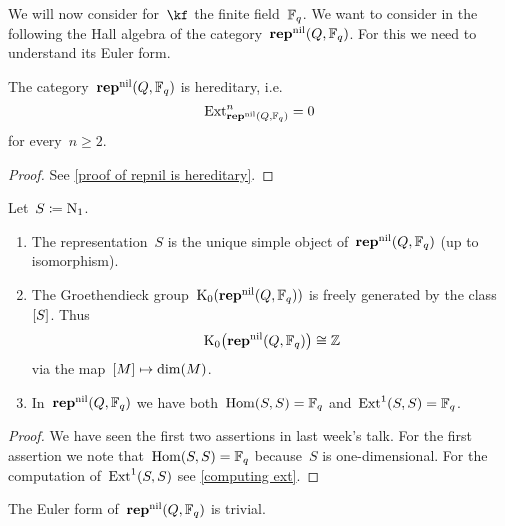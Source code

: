 \documentclass[a4paper,11pt]{scrartcl}
\begin{document}
We will now consider for~$\kf$ the finite field~$\mathbb{F}_q$.
We want to consider in the following the Hall algebra of the category~$\mathbf{rep}^{\mathrm{nil}}(Q, \mathbb{F}_q)$.
For this we need to understand its Euler form.

\begin{proposition}
  \label{repnil is hereditary}
  The category~$\mathbf{rep}^{\mathrm{nil}}(Q, \mathbb{F}_q)$ is hereditary, i.e.
  \[
    \operatorname{Ext}^n_{\mathbf{rep}^{\mathrm{nil}}(Q, \mathbb{F}_q)}
    =
    0
  \]
  for every~$n \geq 2$.
\end{proposition}

\begin{proof}
  See \cref{proof of repnil is hereditary}.
\end{proof}

\begin{lemma}
  Let~$S \coloneqq \mathrm{N}_1$.
  \begin{enumerate}
    \item
      The representation~$S$ is the unique simple object of~$\mathbf{rep}^{\mathrm{nil}}(Q, \mathbb{F}_q)$ (up to isomorphism).
    \item
      The Groethendieck group~$\operatorname{K}_0(\mathbf{rep}^{\mathrm{nil}}(Q, \mathbb{F}_q))$ is freely generated by the class~$[S]$.
      Thus
      \[
        \operatorname{K}_0\bigl( \mathbf{rep}^{\mathrm{nil}}(Q, \mathbb{F}_q) \bigr)
        \cong
        \mathbb{Z}
      \]
      via the map~$[M] \mapsto \dim(M)$.
    \item
      In~$\mathbf{rep}^{\mathrm{nil}}(Q, \mathbb{F}_q)$ we have both~$\operatorname{Hom}(S, S) = \mathbb{F}_q$ and~$\operatorname{Ext}^1(S,S) = \mathbb{F}_q$.
  \end{enumerate}
\end{lemma}

\begin{proof}
  We have seen the first two assertions in last week’s talk.
  For the first assertion we note that~$\operatorname{Hom}(S, S) = \mathbb{F}_q$ because~$S$ is one-dimensional.      
  For the computation of~$\operatorname{Ext}^1(S,S)$ see \cref{computing ext}.
\end{proof}

\begin{corollary}
  \label{euler form is trivial}
  The Euler form of~$\mathbf{rep}^{\mathrm{nil}}(Q, \mathbb{F}_q)$ is trivial.
\end{corollary}
\end{document}
